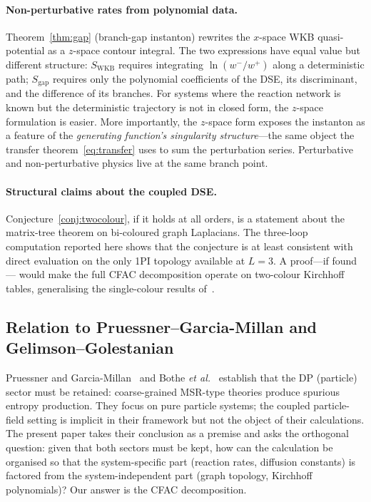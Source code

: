 \documentclass[11pt,a4paper]{article}
\theoremstyle{plain}
\begin{document}
\paragraph{Non-perturbative rates from polynomial data.}
Theorem~\ref{thm:gap} (branch-gap instanton) rewrites the
$x$-space WKB quasi-potential as a $z$-space contour integral.
The two expressions have equal value but different structure:
$S_{\mathrm{WKB}}$ requires integrating $\ln(w^-/w^+)$ along a
deterministic path; $S_{\mathrm{gap}}$ requires only the
polynomial coefficients of the DSE, its discriminant, and the
difference of its branches.  For systems where the reaction
network is known but the deterministic trajectory is not in closed
form, the $z$-space formulation is easier.  More importantly, the
$z$-space form exposes the instanton as a feature of the
\emph{generating function's singularity structure}---the same
object the transfer theorem~\eqref{eq:transfer} uses to sum the
perturbation series.  Perturbative and non-perturbative physics
live at the same branch point.

\paragraph{Structural claims about the coupled DSE.}
Conjecture~\ref{conj:twocolour}, if it holds at all orders, is a
statement about the matrix-tree theorem on bi-coloured graph
Laplacians.  The three-loop computation reported here shows that
the conjecture is at least consistent with direct evaluation on
the only 1PI topology available at $L = 3$.  A proof---if found---
would make the full CFAC decomposition operate on two-colour
Kirchhoff tables, generalising the single-colour results
of~\cite{Amarteifio2019Thesis,BognerWeinzierl}.

\subsection{Relation to Pruessner--Garcia-Millan and Gelimson--Golestanian}

Pruessner and Garcia-Millan~\cite{PruessnerGarciaMillan2025} and
Bothe \textit{et al.}~\cite{Bothe2023} establish that the DP
(particle) sector must be retained: coarse-grained MSR-type
theories produce spurious entropy production.  They focus on
pure particle systems; the coupled particle-field setting is
implicit in their framework but not the object of their
calculations.  The present paper takes their conclusion as a
premise and asks the orthogonal question: given that both sectors
must be kept, how can the calculation be organised so that the
system-specific part (reaction rates, diffusion constants) is
factored from the system-independent part (graph topology,
Kirchhoff polynomials)?  Our answer is the CFAC decomposition.
\end{document}
